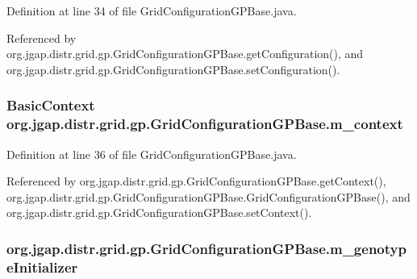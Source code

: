 Definition at line 34 of file Grid\-Configuration\-G\-P\-Base.\-java.



Referenced by org.\-jgap.\-distr.\-grid.\-gp.\-Grid\-Configuration\-G\-P\-Base.\-get\-Configuration(), and org.\-jgap.\-distr.\-grid.\-gp.\-Grid\-Configuration\-G\-P\-Base.\-set\-Configuration().

\hypertarget{classorg_1_1jgap_1_1distr_1_1grid_1_1gp_1_1_grid_configuration_g_p_base_ab378a3b0e8ad6c33c9a98c5db4758650}{
\subsubsection[{m\-\_\-context}]{\setlength{\rightskip}{0pt plus 5cm}Basic\-Context org.\-jgap.\-distr.\-grid.\-gp.\-Grid\-Configuration\-G\-P\-Base.\-m\-\_\-context\hspace{0.3cm}{\ttfamily [private]}}}\label{classorg_1_1jgap_1_1distr_1_1grid_1_1gp_1_1_grid_configuration_g_p_base_ab378a3b0e8ad6c33c9a98c5db4758650}


Definition at line 36 of file Grid\-Configuration\-G\-P\-Base.\-java.



Referenced by org.\-jgap.\-distr.\-grid.\-gp.\-Grid\-Configuration\-G\-P\-Base.\-get\-Context(), org.\-jgap.\-distr.\-grid.\-gp.\-Grid\-Configuration\-G\-P\-Base.\-Grid\-Configuration\-G\-P\-Base(), and org.\-jgap.\-distr.\-grid.\-gp.\-Grid\-Configuration\-G\-P\-Base.\-set\-Context().

\hypertarget{classorg_1_1jgap_1_1distr_1_1grid_1_1gp_1_1_grid_configuration_g_p_base_a49fb05ca26c12884c850b30618be5104}{
\subsubsection[{m\-\_\-genotype\-Initializer}]{ org.\-jgap.\-distr.\-grid.\-gp.\-Grid\-Configuration\-G\-P\-Base.\-m\-\_\-genotype\-Initializer\hspace{0.3cm}{\ttfamily [private]}}}\label{classorg_1_1jgap_1_1distr_1_1grid_1_1gp_1_1_grid_configuration_g_p_base_a49fb05ca26c12884c850b30618be5104}


